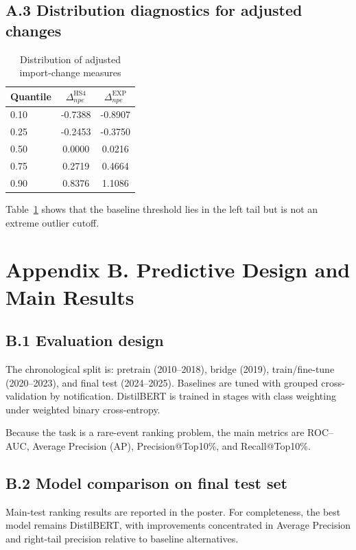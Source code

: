 \documentclass[11pt,a4paper]{article}
\begin{document}
\subsection*{A.3 Distribution diagnostics for adjusted changes}
\begin{table}[htbp]
\centering
\caption{Distribution of adjusted import-change measures}
\label{tab:label-quantiles}
\begin{tabular}{lcc}
\toprule
Quantile & $\Delta^{\mathrm{HS4}}_{npe}$ & $\Delta^{\mathrm{EXP}}_{npe}$ \\
\midrule
0.10 & -0.7388 & -0.8907 \\
0.25 & -0.2453 & -0.3750 \\
0.50 & \phantom{-}0.0000 & \phantom{-}0.0216 \\
0.75 & \phantom{-}0.2719 & \phantom{-}0.4664 \\
0.90 & \phantom{-}0.8376 & \phantom{-}1.1086 \\
\bottomrule
\end{tabular}
\end{table}

Table~\ref{tab:label-quantiles} shows that the baseline threshold lies in the left tail but is not an extreme outlier cutoff.

\section*{Appendix B. Predictive Design and Main Results}

\subsection*{B.1 Evaluation design}
The chronological split is: pretrain (2010--2018), bridge (2019), train/fine-tune (2020--2023), and final test (2024--2025). Baselines are tuned with grouped cross-validation by notification. DistilBERT is trained in stages with class weighting under weighted binary cross-entropy.

Because the task is a rare-event ranking problem, the main metrics are ROC--AUC, Average Precision (AP), Precision@Top10\%, and Recall@Top10\%.

\subsection*{B.2 Model comparison on final test set}
Main-test ranking results are reported in the poster. For completeness, the best model remains DistilBERT, with improvements concentrated in Average Precision and right-tail precision relative to baseline alternatives.
\end{document}
